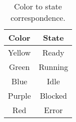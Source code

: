 \begin{table}[H]
\centering
\setlength\extrarowheight{3pt}
\begin{tabulary}{\textwidth}{|C|C|}
\hline
\textbf{Color} & \textbf{State} \\
\hline
Yellow & Ready \\
\hline
Green & Running \\
\hline
Blue & Idle \\
\hline
Purple & Blocked \\
\hline
Red & Error \\
\hline
\end{tabulary}
\caption{Color to state correspondence.}
\label{ganttcolors}
\end{table}
\FloatBarrier